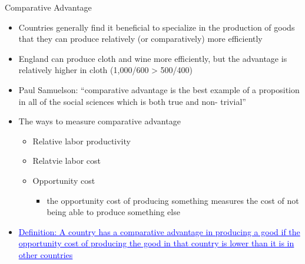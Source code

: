 \documentclass[10pt,hyperref={CJKbookmarks=true},xcolor=dvipsnames,aspectratio=169]{beamer}
\begin{document}
\begin{frame}[allowframebreaks]{Comparative Advantage}

\begin{itemize}
\item Countries generally find it beneficial to specialize in the production
of goods that they can produce relatively (or comparatively) more
efficiently
\item England can produce cloth and wine more efficiently, but the advantage
is relatively higher in cloth (1,000/600 > 500/400) 
\item Paul Samuelson: “comparative advantage is the best example of a proposition
in all of the social sciences which is both true and non- trivial” 
\item The ways to measure comparative advantage

\begin{itemize}
\item Relative labor productivity
\item Relatvie labor cost
\item Opportunity cost

\begin{itemize}
\item the opportunity cost of producing something measures the cost of not
being able to produce something else 
\end{itemize}
\end{itemize}
\item \textcolor{blue}{\uline{Definition: A country has a comparative
advantage in producing a good if the opportunity cost of producing
the good in that country is lower than it is in other countries }}
\end{itemize}
\end{frame}
\end{document}
